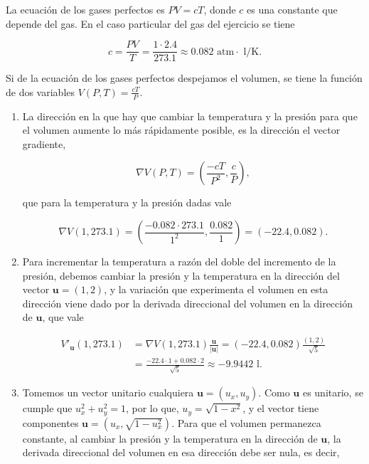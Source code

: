 \documentclass[
  spanish,
  a4paper,
]{scrreport}
\theoremstyle{definition}
\theoremstyle{remark}
\begin{document}
\begin{tcolorbox}[enhanced jigsaw, arc=.35mm, bottomrule=.15mm, bottomtitle=1mm, breakable, colback=white, colbacktitle=quarto-callout-tip-color!10!white, colframe=quarto-callout-tip-color-frame, coltitle=black, left=2mm, leftrule=.75mm, opacityback=0, opacitybacktitle=0.6, rightrule=.15mm, title=\textcolor{quarto-callout-tip-color}{\faLightbulb}\hspace{0.5em}{Solución}, titlerule=0mm, toprule=.15mm, toptitle=1mm]

La ecuación de los gases perfectos es \(PV = cT\), donde \(c\) es una
constante que depende del gas. En el caso particular del gas del
ejercicio se tiene

\[
c = \frac{PV}{T} = \frac{1\cdot 2.4}{273.1} \approx 0.082 \mbox{ atm$\cdot$ l$/$K}.
\]

Si de la ecuación de los gases perfectos despejamos el volumen, se tiene
la función de dos variables \(V(P,T) = \frac{cT}{P}\).

\begin{enumerate}
\def\labelenumi{\alph{enumi}.}
\item
  La dirección en la que hay que cambiar la temperatura y la presión
  para que el volumen aumente lo más rápidamente posible, es la
  dirección el vector gradiente,

  \[
  \nabla V(P,T) 
  = \left(\frac{-cT}{P^2}, \frac{c}{P}\right),
  \]

  que para la temperatura y la presión dadas vale

  \[
  \nabla V(1, 273.1) 
  = \left(\frac{-0.082\cdot 273.1}{1^2}, \frac{0.082}{1}\right)
  = (-22.4, 0.082).
  \]
\item
  Para incrementar la temperatura a razón del doble del incremento de la
  presión, debemos cambiar la presión y la temperatura en la dirección
  del vector \(\mathbf{u}=(1,2)\), y la variación que experimenta el
  volumen en esta dirección viene dado por la derivada direccional del
  volumen en la dirección de \(\mathbf{u}\), que vale

  \begin{align*}
  V'_{\mathbf{u}}(1,273.1) 
  &= \nabla V(1, 273.1) \frac{\mathbf{u}}{|\mathbf{u}|} 
  = (-22.4, 0.082)\frac{(1,2)}{\sqrt{5}} \\ 
  &= \frac{-22.4\cdot 1 + 0.082\cdot 2}{\sqrt{5}}
  \approx -9.9442 \mbox{ l}.
  \end{align*}
\item
  Tomemos un vector unitario cualquiera \(\mathbf{u}=(u_x,u_y)\). Como
  \(\mathbf{u}\) es unitario, se cumple que \(u_x^2+u_y^2=1\), por lo
  que, \(u_y=\sqrt{1-x^2}\), y el vector tiene componentes
  \(\mathbf{u}=(u_x,\sqrt{1-u_x^2})\). Para que el volumen permanezca
  constante, al cambiar la presión y la temperatura en la dirección de
  \(\mathbf{u}\), la derivada direccional del volumen en esa dirección
  debe ser nula, es decir,


\end{enumerate}
\end{tcolorbox}
\end{document}
